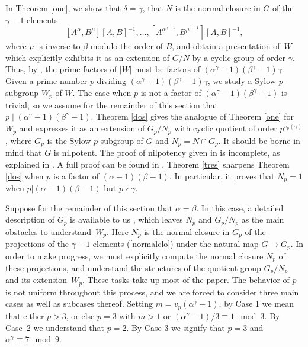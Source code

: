 \documentclass{amsart}
\theoremstyle{definition}
\theoremstyle{remark}
\begin{document}
In Theorem \ref{one}, we show that $\delta=\gamma$, that $N$ is the normal closure in $G$
of the $\gamma-1$ elements
\begin{equation}
\label{normalclo}
[A^\alpha,B^\mu][A,B]^{-1},\dots, [A^{\alpha^{\gamma-1}},B^{\mu^{\gamma-1}}][A,B]^{-1},
\end{equation}
where $\mu$ is inverse to $\beta$ modulo the order of $B$, and obtain a presentation of~$W$ which explicitly exhibits it
as an extension of $G/N$ by a cyclic group of order $\gamma$. Thus, by \cite[Section 4]{M}, the prime factors
of $|W|$ must be factors of $(\alpha^\gamma-1)(\beta^\gamma-1)\gamma$. Given a prime number $p$
dividing $(\alpha^\gamma-1)(\beta^\gamma-1)\gamma$, we study a Sylow $p$-subgroup $W_p$ of $W$.
The case when $p$ is not a factor of $(\alpha^\gamma-1)(\beta^\gamma-1)$ is trivial, so we assume
for the remainder of this section that $p\mid (\alpha^\gamma-1)(\beta^\gamma-1)$. Theorem \ref{dos} gives the analogue
of Theorem \ref{one} for $W_p$ and expresses it as an extension of $G_p/N_p$ with cyclic quotient of order $p^{v_p(\gamma)}$,
where $G_p$ is the Sylow $p$-subgroup of $G$ and $N_p=N\cap G_p$. It should be borne in mind that $G$ is nilpotent.
The proof of nilpotency given in \cite{M}
is incomplete, as explained in \cite{MS}. A full proof can be found in \cite{Sz}. 
Theorem \ref{tres} sharpens Theorem \ref{dos} when $p$ is a factor
of $(\alpha-1)(\beta-1)$. In particular, it proves that $N_p=1$ when $p|(\alpha-1)(\beta-1)$ but $p\nmid \gamma$.

Suppose for the remainder of this section that $\alpha=\beta$. In this case, a detailed description of $G_p$
is available to us \cite{MS}, which leaves $N_p$ and $G_p/N_p$ as the main obstacles to understand~$W_p$. 
Here $N_p$ is the normal closure in $G_p$ of the projections of the $\gamma-1$ elements (\ref{normalclo})
under the natural map $G\to G_p$. In order to make progress, we must explicitly compute 
the normal closure $N_p$ of these projections, and understand the structures of the quotient group $G_p/N_p$ and its
extension~$W_p$. These tasks
take up most of the paper. The behavior of $p$ is not uniform throughout this process, and we are forced to
consider three main cases as well as subcases thereof. Setting $m=v_p(\alpha^\gamma-1)$,
by Case 1 we mean that either $p>3$, or else $p=3$ with $m>1$ or $(\alpha^\gamma-1)/3\equiv 1\mod 3$.
By Case~2 we understand that $p=2$. By Case 3 we signify that $p=3$ and $\alpha^\gamma\equiv 7\mod 9$.

\end{document}
